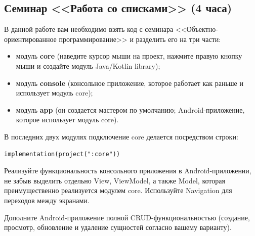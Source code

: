 \subsection{Семинар <<Работа со списками>> (4 часа)}

В данной работе вам необходимо взять код с семинара 
<<Объектно-ориентированное программирование>> и разделить его на три части:
\begin{itemize}
\item модуль \textbf{core} (наведите курсор мыши на проект, нажмите правую кнопку мыши и создайте 
модуль Java/Kotlin library);
\item модуль \textbf{console} (консольное приложение, которое работает как раньше и использует
модуль core);
\item модуль \textbf{app} (он создается мастером по умолчанию; Android-приложение, которое
использует модуль core).
\end{itemize}

В последних двух модулях подключение core делается посредством строки:

\begin{verbatim} 
implementation(project(":core"))
\end{verbatim}

Реализуйте функциональность консольного приложения в Android-приложении, 
не забыв выделить отдельно View, ViewModel, а также Model, которая преимущественно
реализуется модулем core. Используйте Navigation для переходов между экранами.

Дополните Android-приложение полной CRUD-функциональностью (создание, просмотр, обновление
и удаление сущностей согласно вашему варианту).
